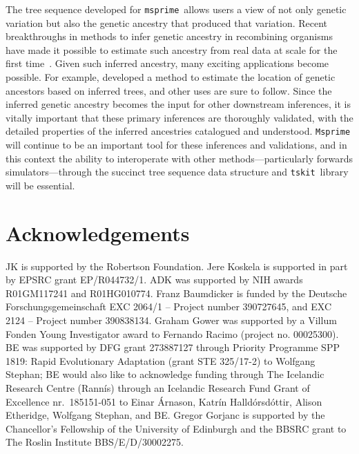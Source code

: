 \documentclass{article}
\newcommand{\msprime}[0]{\texttt{msprime}}
\newcommand{\tskit}[0]{\texttt{tskit}}
\begin{document}
The tree sequence developed for \msprime\ allows users a view of not only
genetic variation but also the genetic ancestry that produced that variation.
Recent breakthroughs in methods to infer genetic ancestry in recombining
organisms~\citep{kelleher2019inferring,
speidel2019method,wohns2021unified,schaefer2021ancestral,speidel2021inferring}
have made it possible to estimate such ancestry from real data at scale for
the first time~\citep{harris2019database,tang2019genealogy}.
Given such inferred ancestry, many exciting applications
become possible. For example, \cite{osmond2021estimating}
developed a method to estimate the location of genetic ancestors
based on inferred trees, and other uses are sure to follow.
Since the inferred genetic ancestry
becomes the input for other downstream inferences, it is vitally
important that these primary inferences are thoroughly validated,
with the detailed properties of the inferred ancestries
catalogued and understood.
\texttt{Msprime} will continue to be an important tool for these inferences and validations,
and in this context the ability to interoperate
with other methods---particularly forwards simulators---through
the succinct tree sequence data structure and \tskit\ library
will be essential.

\section*{Acknowledgements}
JK is supported by the Robertson Foundation.
Jere Koskela is supported in part by EPSRC grant EP/R044732/1.
ADK was supported by NIH awards R01GM117241 and R01HG010774.
Franz Baumdicker is funded by the Deutsche Forschungsgemeinschaft
EXC 2064/1 -- Project number 390727645, and EXC 2124 -- Project number 390838134.
Graham Gower was supported by a Villum Fonden Young Investigator award to Fernando Racimo (project no. 00025300).
BE was supported by  DFG grant  273887127 through Priority
Programme SPP 1819: Rapid Evolutionary Adaptation (grant STE 325/17-2) to Wolfgang Stephan; BE would also like to acknowledge  funding through The Icelandic Research
Centre (Rann{\'i}s) through an Icelandic Research Fund Grant of  Excellence nr.\ 185151-051 to Einar \'Arnason,  Katr\'in Halld\'orsd\'ottir,  Alison Etheridge,  Wolfgang Stephan, and BE.
Gregor Gorjanc is supported by the Chancellor's Fellowship of the University of
Edinburgh and the BBSRC grant to The Roslin Institute BBS/E/D/30002275.



\end{document}
